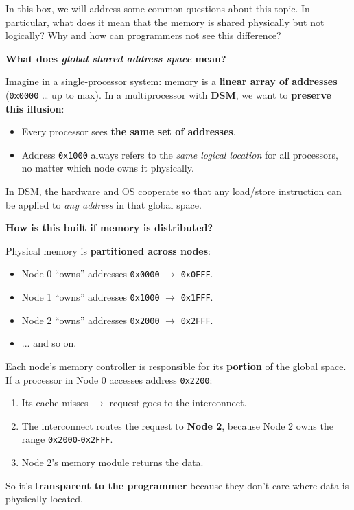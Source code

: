 \begin{takeawaysbox}
    In this box, we will address some common questions about this topic. In particular, what does it mean that the memory is shared physically but not logically? Why and how can programmers not see this difference? 
    \begin{flushleft}
        \textcolor{Green3}{ \textbf{What does \emph{global shared address space} mean?}}
    \end{flushleft}
    Imagine in a single-processor system: memory is a \textbf{linear array of addresses} (\texttt{0x0000} … up to max). In a multiprocessor with \textbf{DSM}, we want to \textbf{preserve this illusion}:
    \begin{itemize}
        \item Every processor sees \textbf{the same set of addresses}.
        \item Address \texttt{0x1000} always refers to the \emph{same logical location} for all processors, no matter which node owns it physically.
    \end{itemize}
    In DSM, the hardware and OS cooperate so that any load/store instruction can be applied to \emph{any address} in that global space.

    \highspace
    \begin{flushleft}
        \textcolor{Green3}{ \textbf{How is this built if memory is distributed?}}
    \end{flushleft}
    Physical memory is \textbf{partitioned across nodes}:
    \begin{itemize}
        \item Node 0 ``owns'' addresses \texttt{0x0000} $\rightarrow$ \texttt{0x0FFF}.
        \item Node 1 ``owns'' addresses \texttt{0x1000} $\rightarrow$ \texttt{0x1FFF}.
        \item Node 2 ``owns'' addresses \texttt{0x2000} $\rightarrow$ \texttt{0x2FFF}.
        \item ... and so on.
    \end{itemize}
    Each node's memory controller is responsible for its \textbf{portion} of the global space. If a processor in Node 0 accesses address \texttt{0x2200}:
    \begin{enumerate}
        \item Its cache misses $\rightarrow$ request goes to the interconnect.
        \item The interconnect routes the request to \textbf{Node 2}, because Node 2 owns the range \texttt{0x2000}-\texttt{0x2FFF}.
        \item Node 2's memory module returns the data.
    \end{enumerate}
    So it's \textbf{transparent to the programmer} because they don't care where data is physically located.


\end{takeawaysbox}
